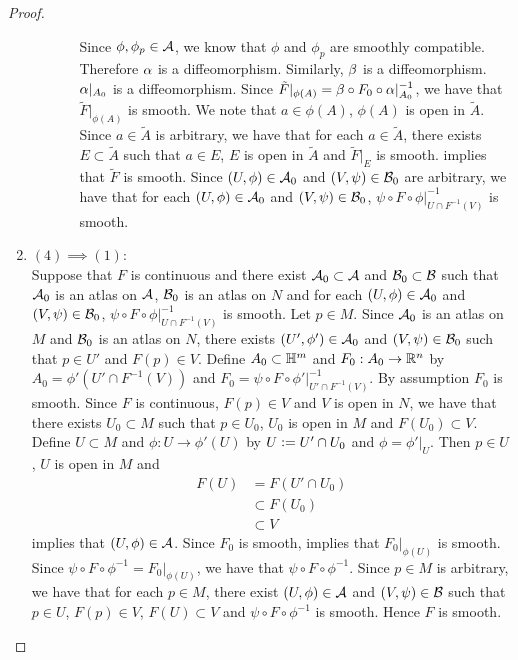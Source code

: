\documentclass{book}
\begin{document}
\begin{proof}
\begin{enumerate}
\begin{itemize}
\begin{itemize}
				Since $\phi, \phi_p \in \mathcal{A}$, we know that $\phi$ and $\phi_p$ are smoothly compatible. Therefore $\alpha$ is a diffeomorphism. Similarly, $\beta$ is a diffeomorphism.  $\alpha|_{A_0}$ is a diffeomorphism. Since $\tilde{F}|_{\phi(A)} = \beta \circ F_0 \circ \alpha|_{A_0}^{-1}$, we have that $\tilde{F}|_{\phi(A)}$ is smooth. We note that $a \in \phi(A)$, $\phi(A)$ is open in $\tilde{A}$. Since $a \in \tilde{A}$ is arbitrary, we have that for each $a \in \tilde{A}$, there exists $E \subset \tilde{A}$ such that $a \in E$, $E$ is open in $\tilde{A}$ and $\tilde{F}|_E$ is smooth.  implies that $\tilde{F}$ is smooth. Since $(U, \phi) \in \mathcal{A}_0$ and $(V, \psi) \in \mathcal{B}_0$ are arbitrary, we have that for each $(U, \phi) \in \mathcal{A}_0$ and $(V, \psi) \in \mathcal{B}_0$, $\psi \circ F \circ \phi|_{U \cap F^{-1}(V)}^{-1}$ is smooth.
			\end{itemize}
		\end{itemize}
		\item $(4) \implies (1)$: \\
		Suppose that $F$ is continuous and there exist $\mathcal{A}_0 \subset \mathcal{A}$ and $\mathcal{B}_0 \subset \mathcal{B}$ such that $\mathcal{A}_0$ is an atlas on $\mathcal{A}$, $\mathcal{B}_0$ is an atlas on $N$ and for each $(U, \phi) \in \mathcal{A}_0$ and $(V, \psi) \in \mathcal{B}_0$, $\psi \circ F \circ \phi|_{U \cap F^{-1}(V)}^{-1}$ is smooth. Let $p \in M$. Since $\mathcal{A}_0$ is an atlas on $M$ and $\mathcal{B}_0$ is an atlas on $N$, there exists $(U',\phi') \in \mathcal{A}_0$ and $(V, \psi) \in \mathcal{B}_0$ such that $p \in U'$ and $F(p) \in V$. Define $A_0 \subset \mathbb{H}^m$ and $F_0:A_0 \rightarrow \mathbb{R}^n$ by $A_0 = \phi'(U' \cap F^{-1}(V))$ and $F_0 = \psi \circ F \circ \phi'|_{U' \cap F^{-1}(V)}^{-1}$. By assumption $F_0$ is smooth. Since $F$ is continuous, $F(p) \in V$ and $V$ is open in $N$, we have that there exists $U_0 \subset M$ such that $p \in U_0$, $U_0$ is open in $M$ and $F(U_0) \subset V$. Define $U \subset M$ and $\phi:U \rightarrow \phi'(U)$ by $U \vcentcolon= U' \cap U_0$ and $\phi = \phi'|_U$. Then $p \in U$, $U$ is open in $M$ and 
		\begin{align*}
			F(U)
			& = F(U' \cap U_0) \\
			& \subset F(U_0) \\
			& \subset V
		\end{align*} 
		 implies that $(U, \phi) \in \mathcal{A}$. Since $F_0$ is smooth,  implies that $F_0|_{\phi(U)}$ is smooth. Since $\psi \circ F \circ \phi^{-1} = F_0|_{\phi(U)}$, we have that $\psi \circ F \circ \phi^{-1}$. Since $p \in M$ is arbitrary, we have that for each $p \in M$, there exist $(U, \phi) \in \mathcal{A}$ and $(V, \psi) \in \mathcal{B}$ such that $p \in U$, $F(p) \in V$, $F(U) \subset V$ and $\psi \circ F \circ \phi^{-1}$ is smooth. Hence $F$ is smooth. 
	\end{enumerate}
\end{proof}
\end{document}
